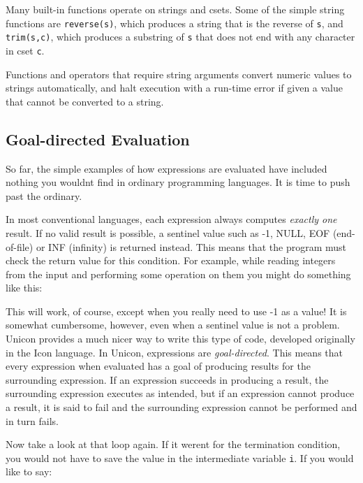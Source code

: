Many built-in functions operate on strings and csets. Some of the simple
string functions are \texttt{reverse(s)}, which
produces a string that is the reverse of \texttt{s}, and
\texttt{trim(s,c)}, which produces a substring of
\texttt{s} that does not end with any character in cset \texttt{c}.

Functions and operators that require string arguments convert numeric
values to strings automatically, and halt execution with a run-time
error if given a value that cannot be converted to a string.

\subsection[Goal{}-directed Evaluation]{Goal-directed Evaluation}
So far, the simple examples of how
expressions are evaluated have included nothing you
wouldn{\textquotesingle}t find in ordinary programming languages. It is
time to push past the ordinary.

In most conventional languages, each expression always computes
\textit{exactly one} result. If no valid result is possible, a
sentinel value such as -1, NULL, EOF
(end-of-file) or INF (infinity) is
returned instead. This means that the program must check the return
value for this condition. For example, while reading integers from the
input and performing some operation on them you might do something like
this:


This will work, of course, except when you really need to use -1 as a
value! It is somewhat cumbersome, however, even when a sentinel value
is not a problem. Unicon provides a much nicer way to write this type
of code, developed originally in the Icon language. In Unicon,
expressions are \textit{goal-directed}. This means that every
expression when evaluated has a goal of producing results for the
surrounding expression. If an expression succeeds in producing a
result, the surrounding expression executes as intended, but if an
expression cannot produce a result, it is said to fail and the surrounding expression cannot be performed and in
turn fails.

Now take a look at that loop again. If it weren{\textquotesingle}t for
the termination condition, you would not have to save the value in the
intermediate variable \texttt{i}. If you would like to say:

